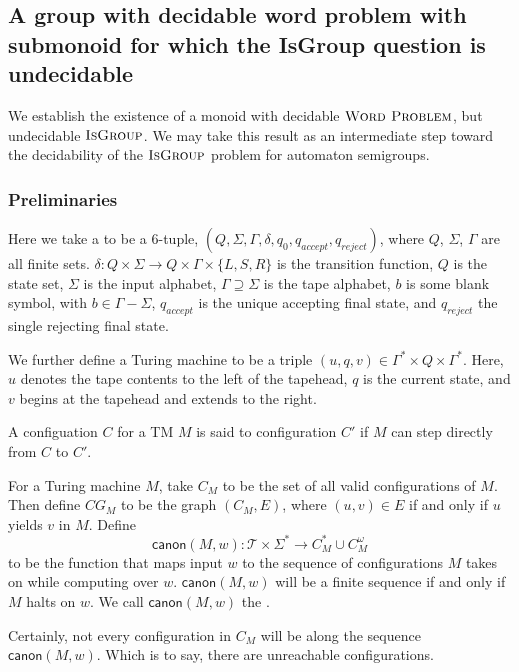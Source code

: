 \documentclass[11pt]{article}
\begin{document}
\subsection{A group with decidable word problem with submonoid for
  which the IsGroup question is undecidable}

We establish the existence of a monoid with decidable
$\textsc{Word Problem}$, but undecidable $\textsc{IsGroup}$. We may
take this result as an intermediate step toward the decidability of
the $\textsc{IsGroup}$ problem for automaton semigroups.

\subsubsection*{Preliminaries}
Here we take a  to be a 6-tuple,
$(Q, \Sigma, \Gamma, \delta, q_0, q_{accept}, q_{reject})$, where $Q$,
$\Sigma$, $\Gamma$ are all finite sets.
$\delta : Q \times \Sigma \rightarrow Q\times \Gamma \times \{L,S,R\}$
is the transition function, $Q$ is the state set, $\Sigma$ is the
input alphabet, $\Gamma \supseteq \Sigma$ is the tape alphabet, $b$ is
some blank symbol, with $b \in \Gamma - \Sigma$, $q_{accept}$ is the
unique accepting final state, and $q_{reject}$ the single rejecting
final state.

We further define a Turing machine  to be a triple
$(u, q, v) \in \Gamma^* \times Q \times \Gamma^*$. Here, $u$ denotes
the tape contents to the left of the tapehead, $q$ is the current
state, and $v$ begins at the tapehead and extends to the right.

A configuation $C$ for a TM $M$ is said to  configuration
$C'$ if $M$ can step directly from $C$ to $C'$.

For a Turing machine $M$, take $C_M$ to be the set of all valid
configurations of $M$. Then define $CG_M$ to be the graph $(C_M, E)$,
where $(u,v) \in E$ if and only if $u$ yields $v$ in $M$. Define
\[
  \textsf{canon}(M, w) : \mathcal{T} \times \Sigma^*
      \rightarrow
       C_M^*\cup C_M^\omega
\]
to be the function that maps input $w$ to the sequence of
configurations $M$ takes on while computing over
$w$. $\textsf{canon}(M, w)$ will be a finite sequence if and only if
$M$ halts on $w$. We call $\textsf{canon}(M, w)$ the .

Certainly, not every configuration in $C_M$ will be along the sequence
$\textsf{canon}(M,w)$. Which is to say, there are unreachable
configurations.
\end{document}
